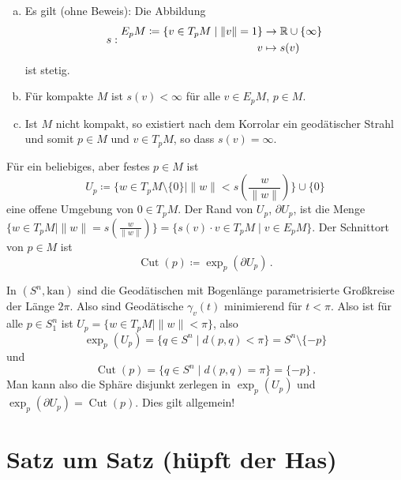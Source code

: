 \documentclass[a4paper,twoside,DIV15,BCOR12mm]{scrbook}
\renewcommand{\da}{\coloneqq}
\newcommand{\kan}{\text{kan}}
\DeclareMathOperator{\cut}{Cut}
\begin{document}
\begin{bemerkung}
\begin{enumerate}[(a)]
\item Es gilt (ohne Beweis): Die Abbildung 
\[
s:
\begin{aligned}
E_pM \da \{v \in T_pM \mid \|v\|=1\} &\to \MdR\cup\{\infty\} \\
v &\mapsto s(v)
\end{aligned}
\] ist stetig.
\item Für kompakte $M$ ist $s(v) < \infty$ für alle $v\in E_pM$, $p\in M$.
\item Ist $M$ nicht kompakt, so existiert nach dem Korrolar ein geodätischer Strahl und somit $p\in M$ und $v\in T_pM$, so dass $s(v)=\infty$.
\end{enumerate}
\end{bemerkung}

Für ein beliebiges, aber festes $p\in M$ ist
\[
U_p \da \{ w\in T_pM\setminus \{0\} \mid \|w\| < s(\frac w {\|w\|})\} \cup \{0\}
\] eine offene Umgebung von $0\in T_pM$. Der Rand von $U_p$, $\partial U_p$, ist die Menge $\{w\in T_pM | \|w\| = s(\frac w{\|w\|})\} = \{s(v) \cdot v \in T_pM \mid v \in E_pM\}$. Der Schnittort von $p\in M$ ist \[ \cut(p) \da \exp_p(\partial U_p)\,.\]

\begin{beispiel}
In $(S^n,\kan)$ sind die Geodätischen mit Bogenlänge parametrisierte Großkreise der Länge $2\pi$. Also sind Geodätische $\gamma_v(t)$ minimierend für $t<\pi$. Also ist für alle $p\in S^n_1$ ist $U_p=\{w\in T_pM \mid \|w\| <\pi\}$, also \[\exp_p(U_p) = \{q\in S^n \mid d(p,q)<\pi \} = S^n\setminus \{-p\}\] und \[\cut(p) = \{q\in S^n \mid d(p,q)=\pi \} = \{-p\}\,.\] Man kann also die Sphäre disjunkt zerlegen in $\exp_p(U_p)$ und $\exp_p(\partial U_p) = \cut(p)$. Dies gilt allgemein!
\end{beispiel}


\appendix

\chapter{Satz um Satz (hüpft der Has)}

\renewcommand{\indexname}{Stichwortverzeichnis}
\addtocounter{chapter}{1}
\printindex
\end{document}
